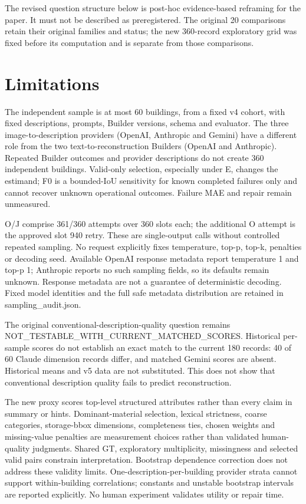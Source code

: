 The revised question structure below is post-hoc evidence-based reframing for the paper. It must not be described as preregistered. The original 20 comparisons retain their original families and status; the new 360-record exploratory grid was fixed before its computation and is separate from those comparisons.

\section{Limitations}

The independent sample is at most 60 buildings, from a fixed v4 cohort, with fixed descriptions, prompts, Builder versions, schema and evaluator. The three image-to-description providers (OpenAI, Anthropic and Gemini) have a different role from the two text-to-reconstruction Builders (OpenAI and Anthropic). Repeated Builder outcomes and provider descriptions do not create 360 independent buildings. Valid-only selection, especially under E, changes the estimand; F0 is a bounded-IoU sensitivity for known completed failures only and cannot recover unknown operational outcomes. Failure MAE and repair remain unmeasured.

O/J comprise 361/360 attempts over 360 slots each; the additional O attempt is the approved slot 940 retry. These are single-output calls without controlled repeated sampling. No request explicitly fixes temperature, top-p, top-k, penalties or decoding seed. Available OpenAI response metadata report temperature 1 and top-p 1; Anthropic reports no such sampling fields, so its defaults remain unknown. Response metadata are not a guarantee of deterministic decoding. Fixed model identities and the full safe metadata distribution are retained in sampling\_audit.json.

The original conventional-description-quality question remains NOT\_TESTABLE\_WITH\_CURRENT\_MATCHED\_SCORES. Historical per-sample scores do not establish an exact match to the current 180 records: 40 of 60 Claude dimension records differ, and matched Gemini scores are absent. Historical means and v5 data are not substituted. This does not show that conventional description quality fails to predict reconstruction.

The new proxy scores top-level structured attributes rather than every claim in summary or hints. Dominant-material selection, lexical strictness, coarse categories, storage-bbox dimensions, completeness ties, chosen weights and missing-value penalties are measurement choices rather than validated human-quality judgments. Shared GT, exploratory multiplicity, missingness and selected valid pairs constrain interpretation. Bootstrap dependence correction does not address these validity limits. One-description-per-building provider strata cannot support within-building correlations; constants and unstable bootstrap intervals are reported explicitly. No human experiment validates utility or repair time.

